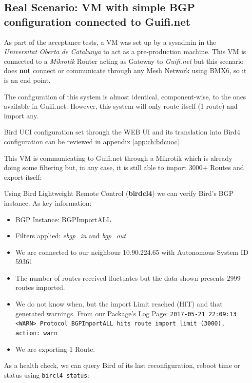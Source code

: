 \subsection{Real Scenario: VM with simple BGP configuration connected to Guifi.net}
As part of the acceptance tests, a VM was set up by a sysadmin in the \textit{Universitat Oberta de Catalunya} to act as a pre-production machine. This VM is connected to a \textit{Mikrotik} Router acting as Gateway to \textit{Guifi.net} but this scenario does \textbf{not} connect or communicate through any Mesh Network using BMX6, so it is an end point.

The configuration of this system is almost identical, component-wise, to the ones available in Guifi.net. However, this system will only route itself (1 route) and import any.

Bird UCI configuration set through the WEB UI and its translation into Bird4 configuration can be reviewed in appendix \ref{app:ch:bdcuoc}.

This VM is communicating to Guifi.net through a Mikrotik which is already doing some filtering but, in any case, it is still able to import 3000+ Routes and export itself:



Using Bird Lightweight Remote Control (\textbf{birdcl4}) we can verify Bird's BGP instance. As key information:

\begin{itemize}
    \item BGP Instance: BGPImportALL
    \item Filters applied: \textit{ebgp\_in} and \textit{bgp\_out}
    \item We are connected to our neighbour 10.90.224.65 with Autonomous System ID 59361
    \item  The number of routes received fluctuates but the data shown presents 2999 routes imported.
    \item We do not know when, but the import Limit reached (HIT) and that generated warnings.
    From our Package's Log Page:
    \texttt{2017-05-21 22:09:13 <WARN> Protocol BGPImportALL hits route import limit (3000), action: warn}
    \item We are exporting 1 Route.
\end{itemize}

As a health check, we can query Bird of its last reconfiguration, reboot time or status using \texttt{bircl4 status}:


